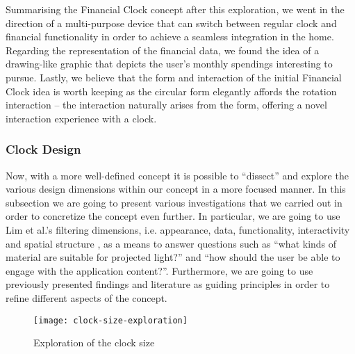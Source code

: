 Summarising the Financial Clock concept after this exploration, we went in the direction of a multi-purpose device that can switch between regular clock and financial functionality in order to achieve a seamless integration in the home. Regarding the representation of the financial data, we found the idea of a drawing-like graphic that depicts the user’s monthly spendings interesting to pursue. Lastly, we believe that the form and interaction of the initial Financial Clock idea is worth keeping as the circular form elegantly affords the rotation interaction -- the interaction naturally arises from the form, offering a novel interaction experience with a clock.

\subsubsection*{Clock Design}
Now, with a more well-defined concept it is possible to “dissect” and explore the various design dimensions within our concept in a more focused manner. In this subsection we are going to present various investigations that we carried out in order to concretize the concept even further. In particular, we are going to use Lim et al.’s filtering dimensions, i.e. appearance, data, functionality, interactivity and spatial structure \cite{lim2008anatomy}, as a means to answer questions such as “what kinds of material are suitable for projected light?” and “how should the user be able to engage with the application content?”. Furthermore, we are going to use previously presented findings and literature as guiding principles in order to refine different aspects of the concept.

\begin{figure}[h]
	\centering
	\texttt{[image: clock-size-exploration]}
	\caption{Exploration of the clock size}
	\label{fig:clock-size-exploration}
\end{figure}

